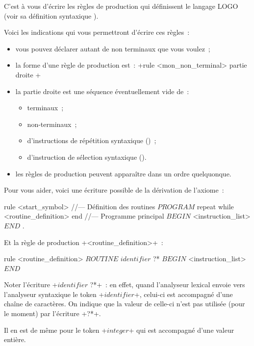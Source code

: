 C'est à vous d'écrire les règles de production qui définissent le langage LOGO (voir sa définition syntaxique ).

Voici les indications qui vous permettront d'écrire ces règles~:
\begin{itemize}
  \item vous pouvez déclarer autant de non terminaux que vous voulez~;
  \item la forme d'une règle de production est~: \ggst+rule <mon_non_terminal> { partie droite }+
  \item la partie droite est une séquence éventuellement vide de~:
  \begin{itemize}
    \item terminaux~;
    \item non-terminaux~;
    \item d'instructions de répétition syntaxique ()~;
    \item d'instruction de sélection syntaxique ().
  \end{itemize}
  \item les règles de production peuvent apparaître dans un ordre quelquonque.
\end{itemize}

Pour vous aider, voici une écriture possible de la dérivation de l'axiome~:

\begin{galgas3}
rule <start_symbol> {
//--- Définition des routines
  $PROGRAM$
  repeat
  while
    <routine_definition>
  end
//--- Programme principal
  $BEGIN$
  <instruction_list>
  $END$
  $.$
}
\end{galgas3}

Et la règle de production \ggst+<routine_definition>+~:

\begin{galgas3}
rule <routine_definition> {
  $ROUTINE$
  $identifier$ ?*
  $BEGIN$
  <instruction_list>
  $END$
}
\end{galgas3}

Noter l’écriture \ggst+$identifier$ ?*+~: en effet, quand l’analyseur lexical envoie vers l’analyseur syntaxique le token \ggst+$identifier$+, celui-ci est accompagné d’une chaîne de caractères. On indique que la valeur de celle-ci n’est pas utilisée (pour le moment) par l’écriture \ggst+?*+.

Il en est de même pour le token \ggst+$integer$+ qui est accompagné d’une valeur entière.

